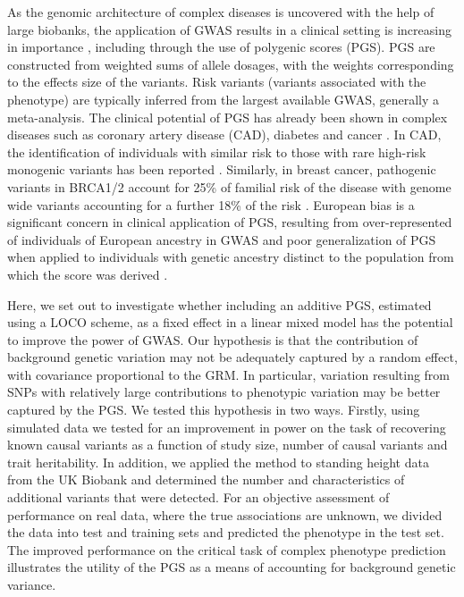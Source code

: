 \documentclass[fleqn,10pt]{wlscirep}
\begin{document}
As the genomic architecture of complex diseases is uncovered with the help of large biobanks, the application of GWAS results in a clinical setting is increasing in importance \cite{tam2019benefits}, including through the use of polygenic scores (PGS). PGS are constructed from weighted sums of allele dosages, with the weights corresponding to the effects size of the variants. Risk variants (variants associated with the phenotype) are typically inferred from the largest available GWAS, generally a meta-analysis. The clinical potential of PGS has already been shown in complex diseases such as coronary artery disease (CAD), diabetes and cancer  \cite{khera2018genome, torkamani2018personal, yanes2020clinical}. In CAD, the identification of individuals with similar risk to those with rare high-risk monogenic variants has been reported \cite{khera2018genome}. Similarly, in breast cancer, pathogenic variants in BRCA1/2 account for 25\% of familial risk of the disease with genome wide variants accounting for a further 18\% of the risk \cite{michailidou2017association,bahcall2013common}. European bias is a significant concern in clinical application of PGS, resulting from over-represented of individuals of European ancestry in GWAS and poor generalization of PGS when applied to individuals with genetic ancestry distinct to the population from which the score was derived \cite{lambert2019towards,duncan2019analysis}.  

\par\par

Here, we set out to investigate whether including an additive PGS, estimated using a LOCO scheme, as a fixed effect in a linear mixed model has the potential to improve the power of GWAS. Our hypothesis is that the contribution of background genetic variation may not be adequately captured by a random effect, with covariance proportional to the GRM. In particular, variation resulting from SNPs with relatively large contributions to phenotypic variation may be better captured by the PGS. We tested this hypothesis in two ways. Firstly, using simulated data we tested for an improvement in power on the task of recovering known causal variants as a function of study size, number of causal variants and trait heritability. In addition, we applied the method to standing height data from the UK Biobank and determined the number and characteristics of additional variants that were detected. For an objective assessment of performance on real data, where the true associations are unknown, we divided the data into test and training sets and predicted the phenotype in the test set. The improved performance on the critical task of complex phenotype prediction illustrates the utility of the PGS as a means of accounting for background genetic variance.
\end{document}
